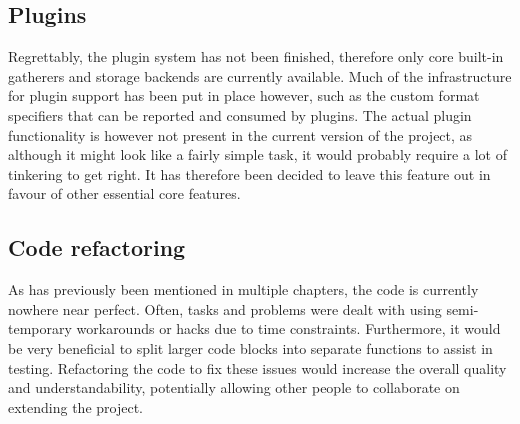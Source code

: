     \subsection{Plugins}
        Regrettably, the plugin system has not been finished, therefore only core built-in gatherers and storage backends are currently available. Much of the infrastructure for plugin support has been put in place however, such as the custom format specifiers that can be reported and consumed by plugins. The actual plugin functionality is however not present in the current version of the project, as although it might look like a fairly simple task, it would probably require a lot of tinkering to get right. It has therefore been decided to leave this feature out in favour of other essential core features.
        
    \subsection{Code refactoring}
        As has previously been mentioned in multiple chapters, the code is currently nowhere near perfect. Often, tasks and problems were dealt with using semi-temporary workarounds or hacks due to time constraints. Furthermore, it would be very beneficial to split larger code blocks into separate functions to assist in testing. Refactoring the code to fix these issues would increase the overall quality and understandability, potentially allowing other people to collaborate on extending the project.